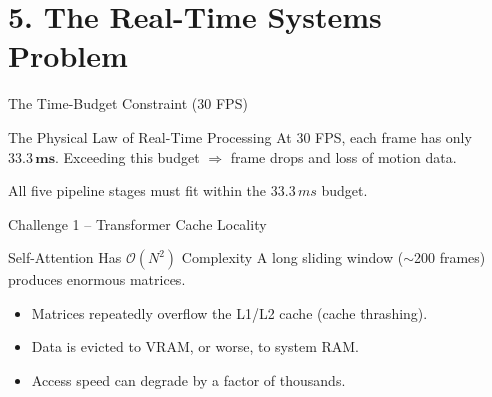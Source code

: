 \documentclass[aspectratio=169]{beamer}
\begin{document}
\section{5. The Real-Time Systems Problem}
\begin{frame}{The Time-Budget Constraint (30 FPS)}
    \begin{alertblock}{The Physical Law of Real-Time Processing}
        At 30 FPS, each frame has only $\mathbf{33.3\,ms}$. Exceeding this budget $\Rightarrow$ frame drops and loss of motion data.
    \end{alertblock}
    \vspace{0.4cm}
    \begin{center}
    \end{center}
    \vspace{0.3cm}
    \centering\small All five pipeline stages must fit within the $33.3\,ms$ budget.
\end{frame}

\begin{frame}{Challenge 1 -- Transformer Cache Locality}
    \begin{block}{Self-Attention Has $\mathcal{O}(N^2)$ Complexity}
        A long sliding window ($\sim$200 frames) produces enormous matrices.
    \end{block}
    \vspace{0.3cm}
    \begin{itemize}
        \item Matrices repeatedly overflow the L1/L2 cache (cache thrashing).
        \item Data is evicted to VRAM, or worse, to system RAM.
        \item Access speed can degrade by a factor of thousands.
    \end{itemize}
\end{frame}
\end{document}
